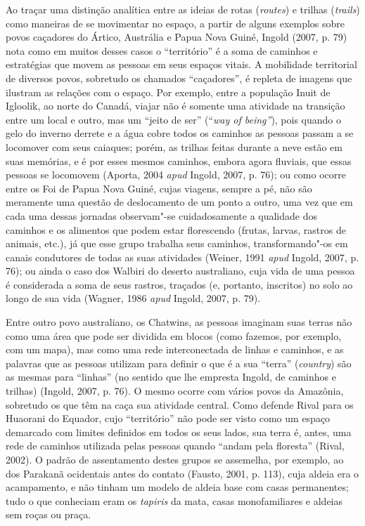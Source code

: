 \asterisc

Ao traçar uma distinção analítica entre as ideias de rotas
(\emph{routes}) e trilhas (\emph{trails}) como maneiras de se movimentar
no espaço, a partir de alguns exemplos sobre povos caçadores do Ártico,
Austrália e Papua Nova Guiné, Ingold (2007, p. 79) nota como em muitos
desses casos o ``território'' é a soma de caminhos e estratégias que
movem as pessoas em seus espaços vitais. A mobilidade territorial de
diversos povos, sobretudo os chamados ``caçadores'', é repleta de
imagens que ilustram as relações com o espaço. Por exemplo, entre a
população Inuit de Igloolik, ao norte do Canadá, viajar não é somente
uma atividade na transição entre um local e outro, mas um ``jeito de
ser'' (``\emph{way of being''}), pois quando o gelo do inverno derrete e
a água cobre todos os caminhos as pessoas passam a se locomover com seus
caiaques; porém, as trilhas feitas durante a neve estão em suas
memórias, e é por esses mesmos caminhos, embora agora fluviais, que
essas pessoas se locomovem (Aporta, 2004 \emph{apud} Ingold, 2007, p. 76); ou
como ocorre entre os Foi de Papua Nova Guiné, cujas viagens, sempre a
pé, não são meramente uma questão de deslocamento de um ponto a outro,
uma vez que em cada uma dessas jornadas observam"-se cuidadosamente a
qualidade dos caminhos e os alimentos que podem estar florescendo
(frutas, larvas, rastros de animais, etc.), já que esse grupo trabalha
seus caminhos, transformando"-os em canais condutores de todas as suas
atividades (Weiner, 1991 \emph{apud} Ingold, 2007, p. 76); ou ainda o caso dos
Walbiri do deserto australiano, cuja vida de uma pessoa é considerada a
soma de seus rastros, traçados (e, portanto, inscritos) no solo ao longo
de sua vida (Wagner, 1986 \emph{apud} Ingold, 2007, p. 79).

Entre outro povo australiano, os Chatwins, as pessoas imaginam suas
terras não como uma área que pode ser dividida em blocos (como fazemos,
por exemplo, com um mapa), mas como uma rede interconectada de linhas e
caminhos, e as palavras que as pessoas utilizam para definir o que é a
sua ``terra'' (\emph{country}) são as mesmas para ``linhas'' (no sentido
que lhe empresta Ingold, de caminhos e trilhas) (Ingold, 2007, p. 76). O
mesmo ocorre com vários povos da Amazônia, sobretudo os que têm na caça
sua atividade central. Como defende Rival para os Huaorani do Equador,
cujo ``território'' não pode ser visto como um espaço demarcado com
limites definidos em todos os seus lados, sua terra é, antes, uma rede
de caminhos utilizada pelas pessoas quando ``andam pela floresta''
(Rival, 2002). O padrão de assentamento destes grupos se assemelha, por
exemplo, ao dos Parakanã ocidentais antes do contato (Fausto, 2001, p.
113), cuja aldeia era o acampamento, e não tinham um modelo de aldeia
base com casas permanentes; tudo o que conheciam eram os \emph{tapiris}
da mata, casas monofamiliares e aldeias sem roças ou praça.

